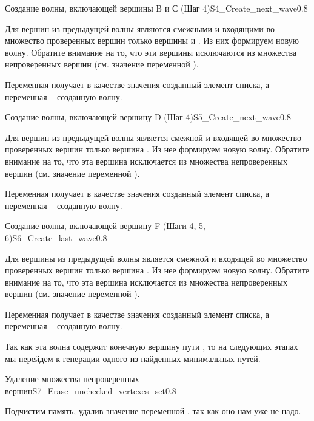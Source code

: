 \begin{algostep}{Создание волны, включающей вершины B и С (Шаг
    4)}{S4_Create_next_wave}{0.8}
  
  Для вершин из предыдущей волны являются смежными и входящими во
  множество проверенных вершин только вершины  и . Из них
  формируем новую волну. Обратите внимание на то, что эти вершины
  исключаются из множества непроверенных вершин (см. значение
  переменной ).

  Переменная  получает в качестве значения
  созданный элемент списка, а переменная  – созданную
  волну.
\end{algostep}


\begin{algostep}{Создание волны, включающей вершину D (Шаг
    4)}{S5_Create_next_wave}{0.8}

  Для вершин из предыдущей волны является смежной и входящей во
  множество проверенных вершин только вершина . Из нее формируем
  новую волну. Обратите внимание на то, что эта вершина исключается из
  множества непроверенных вершин (см. значение переменной
  ).

  Переменная  получает в качестве значения
  созданный элемент списка, а переменная  – созданную
  волну.
\end{algostep}


\begin{algostep}{Создание волны, включающей вершину F (Шаги 4, 5,
    6)}{S6_Create_last_wave}{0.8}

  Для вершины из предыдущей волны является смежной и входящей во
  множество проверенных вершин только вершина . Из нее формируем
  новую волну. Обратите внимание на то, что эта вершина исключается из
  множества непроверенных вершин (см. значение переменной
  ).

  Переменная  получает в качестве значения
  созданный элемент списка, а переменная  – созданную
  волну.

  Так как эта волна содержит конечную вершину пути , то на
  следующих этапах мы перейдем к генерации одного из найденных
  минимальных путей.
\end{algostep}


\begin{algostep}{Удаление множества непроверенных
    вершин}{S7_Erase_unchecked_vertexes_set}{0.8}
 
  Подчистим память, удалив значение переменной
  , так как оно нам уже не надо.
\end{algostep}


